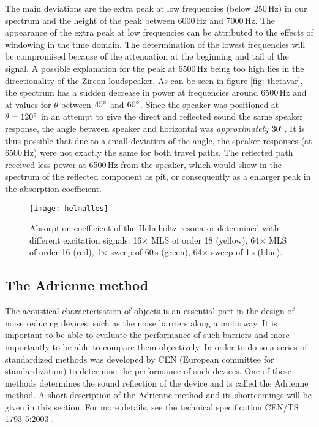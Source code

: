 The main deviations are the extra peak at low frequencies (below 250\,Hz) in our spectrum and the height of the peak between 6000\,Hz and 7000\,Hz. The appearance of the extra peak at low frequencies can be attributed to the effects of windowing in the time domain. The determination of the lowest frequencies will be compromised because of the attenuation at the beginning and tail of the signal. A possible explanation for the peak at 6500\,Hz being too high lies in the directionality of the Zircon loudspeaker. As can be seen in figure \ref{fig: thetavar}, the spectrum has a sudden decrease in power at frequencies around 6500\,Hz and at values for $\theta$ between $45^{\circ}$ and $60^{\circ}$. Since the speaker was positioned at $\theta = 120^{\circ}$ in an attempt to give the direct and reflected sound the same speaker response, the angle between speaker and horizontal was \emph{approximately} $30^{\circ}$. It is thus possible that due to a small deviation of the angle, the speaker responses (at 6500\,Hz) were not exactly the same for both travel paths. The reflected path received less power at 6500\,Hz from the speaker, which would show in the spectrum of the reflected component as pit, or consequently as a enlarger peak in the absorption coefficient.


\begin{figure}[h!]
  \centering
    \texttt{[image: helmalles]}
  \caption{Absorption coefficient of the Helmholtz resonator determined with different excitation signals: 16$\times$ MLS of order 18 (yellow), 64$\times$ MLS of order 16 (red), 1$\times$ sweep of 60\,s (green), 64$\times$ sweep of 1\,s (blue).}
  \label{fig: helmholtzalles}
\end{figure}


\subsection{The Adrienne method}
The acoustical characterisation of objects is an essential part in the design of noise reducing devices, such as the noise barriers along a motorway. It is important to be able to evaluate the performance of such barriers and more importantly to be able to compare them objectively. In order to do so a series of standardized methods was developed by CEN (European committee for standardization) to determine the performance of such devices. One of these methods determines the sound reflection of the device and is called the Adrienne method. A short description of the Adrienne method and its shortcomings will be given in this section. For more details, see the technical specification CEN/TS 1793-5:2003 \cite{Adrienne}.



